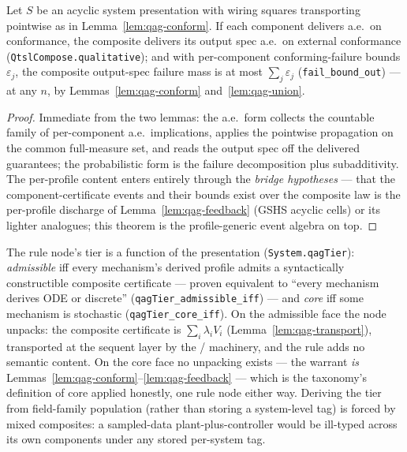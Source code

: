 \begin{bthm}\label{thm:qag-nary}
Let $S$ be an acyclic system presentation with wiring squares
transporting pointwise as in Lemma~\ref{lem:qag-conform}. If each
component delivers a.e.\ on conformance, the composite delivers its
output spec a.e.\ on external conformance
(\texttt{QtslCompose.qualitative}); and with per-component
conforming-failure bounds $\varepsilon_j$, the composite output-spec
failure mass is at most $\sum_j \varepsilon_j$
(\texttt{fail\_bound\_out}) --- at any $n$, by
Lemmas~\ref{lem:qag-conform} and~\ref{lem:qag-union}.
\end{bthm}
\begin{proof}
Immediate from the two lemmas: the a.e.\ form collects the countable
family of per-component a.e.\ implications, applies the pointwise
propagation on the common full-measure set, and reads the output spec
off the delivered guarantees; the probabilistic form is the failure
decomposition plus subadditivity. The per-profile content enters
entirely through the \emph{bridge hypotheses} --- that the
component-certificate events and their bounds exist over the composite
law is the per-profile discharge of Lemma~\ref{lem:qag-feedback} (GSHS
acyclic cells) or its lighter analogues; this theorem is the
profile-generic event algebra on top.
\end{proof}

\begin{bremark}
\label{rem:qag-tier}
The rule node's tier is a function of the presentation
(\texttt{System.qagTier}): \emph{admissible} iff every mechanism's
derived profile admits a syntactically constructible composite
certificate --- proven equivalent to ``every mechanism derives ODE or
discrete'' (\texttt{qagTier\_admissible\_iff}) --- and \emph{core} iff
some mechanism is stochastic (\texttt{qagTier\_core\_iff}). On the
admissible face the node unpacks: the composite certificate is
$\sum_i \lambda_i V_i$ (Lemma~\ref{lem:qag-transport}), transported at
the sequent layer by the /
machinery, and the rule adds no semantic content. On the core face no
unpacking exists --- the warrant \emph{is}
Lemmas~\ref{lem:qag-conform}--\ref{lem:qag-feedback} --- which is the
taxonomy's definition of core applied honestly, one rule node either
way. Deriving the tier from field-family population (rather than
storing a system-level tag) is forced by mixed composites: a
sampled-data plant-plus-controller would be ill-typed across its own
components under any stored per-system tag.
\end{bremark}

